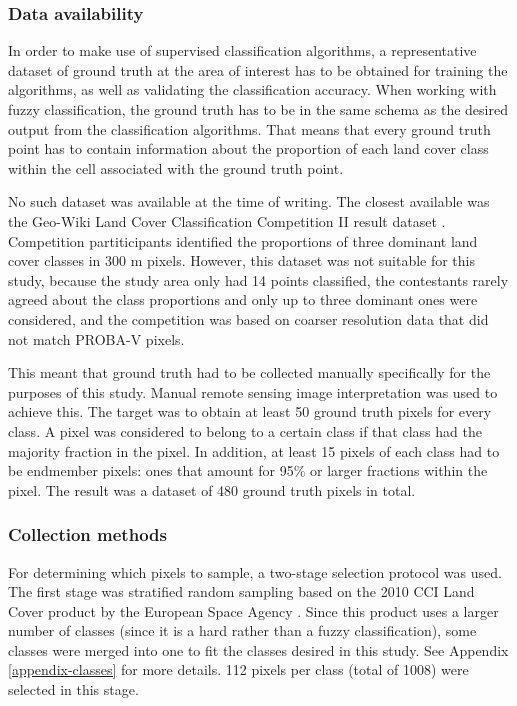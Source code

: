 \documentclass[a4paper,12pt]{scrbook}
\begin{document}
\subsubsection{Data availability}

In order to make use of supervised classification algorithms, a representative dataset of ground truth at the area of interest has to be obtained for training the algorithms, as well as validating the classification accuracy. When working with fuzzy classification, the ground truth has to be in the same schema as the desired output from the classification algorithms. That means that every ground truth point has to contain information about the proportion of each land cover class within the cell associated with the ground truth point.

No such dataset was available at the time of writing. The closest available was the Geo-Wiki Land Cover Classification Competition II result dataset \citep{perger2012geowiki}. Competition partiticipants identified the proportions of three dominant land cover classes in 300 m pixels. However, this dataset was not suitable for this study, because the study area only had 14 points classified, the contestants rarely agreed about the class proportions and only up to three dominant ones were considered, and the competition was based on coarser resolution data that did not match PROBA-V pixels.

This meant that ground truth had to be collected manually specifically for the purposes of this study. Manual remote sensing image interpretation \citep{defries1998training} was used to achieve this. The target was to obtain at least 50 ground truth pixels for every class. A pixel was considered to belong to a certain class if that class had the majority fraction in the pixel. In addition, at least 15 pixels of each class had to be endmember pixels: ones that amount for 95\% or larger fractions within the pixel. The result was a dataset of 480 ground truth pixels in total.

\subsubsection{Collection methods}

For determining which pixels to sample, a two-stage selection protocol was used. The first stage was stratified random sampling based on the 2010 CCI Land Cover product by the European Space Agency \citep{lccciguide}. Since this product uses a larger number of classes (since it is a hard rather than a fuzzy classification), some classes were merged into one to fit the classes desired in this study. See Appendix \ref{appendix-classes} for more details. 112 pixels per class (total of 1008) were selected in this stage.
\end{document}
